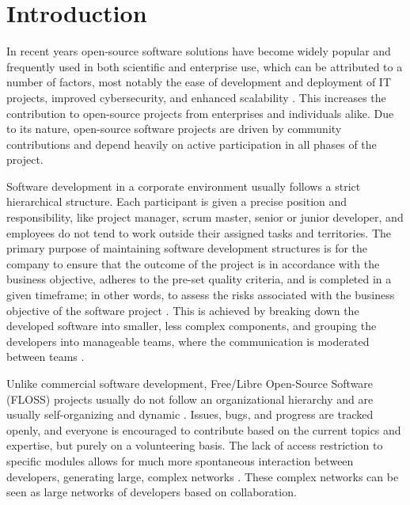 \thepage
\section{Introduction}


In recent years open-source software solutions have become widely popular and frequently used in both scientific and enterprise use, which can be attributed to a number of factors, most notably the ease of development and deployment of IT projects, improved cybersecurity, and enhanced scalability \cite{pwcLeadingBenefitsOpensource2016}. This increases the contribution to open-source projects from enterprises and individuals alike. Due to its nature, open-source software projects are driven by community contributions and depend heavily on active participation in all phases of the project.

Software development in a corporate environment usually follows a strict hierarchical structure. Each participant is given a precise position and responsibility, like project manager, scrum master, senior or junior developer, and employees do not tend to work outside their assigned tasks and territories. The primary purpose of maintaining software development structures is for the company to ensure that the outcome of the project is in accordance with the business objective, adheres to the pre-set quality criteria, and is completed in a given timeframe; in other words, to assess the risks associated with the business objective of the software project \cite{surekaUsingSocialNetwork2011}. This is achieved by breaking down the developed software into smaller, less complex components, and grouping the developers into manageable teams, where the communication is moderated between teams \cite{birdLatentSocialStructure2008}.

Unlike commercial software development, Free/Libre Open-Source Software (FLOSS) projects usually do not follow an organizational hierarchy and are usually self-organizing and dynamic \cite{birdLatentSocialStructure2008}. Issues, bugs, and progress are tracked openly, and everyone is encouraged to contribute based on the current topics and expertise, but purely on a volunteering basis. The lack of access restriction to specific modules allows for much more spontaneous interaction between developers, generating large, complex networks \cite{martinez-romoUsingSocialNetwork2008}. These complex networks can be seen as large networks of developers based on collaboration.


